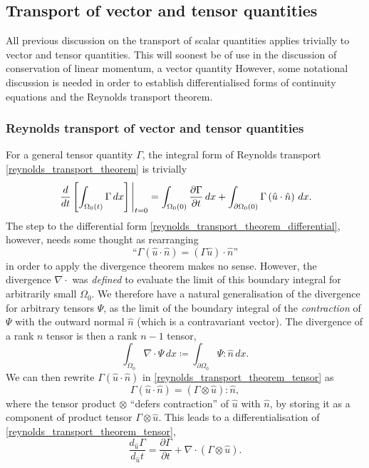 \documentclass[11pt,a4paper]{memoir}
\newcommand{\Part}[2]{\frac{\partial #1}{\partial #2}}
\begin{document}
\subsection{Transport of vector and tensor quantities}
All previous discussion on the transport of scalar quantities applies trivially to vector and tensor quantities.
This will soonest be of use in the discussion of conservation of linear momentum, a vector quantity
However, some notational discussion is needed in order to establish differentialised forms of continuity equations and the Reynolds transport theorem.
\subsubsection{Reynolds transport of vector and tensor quantities}
For a general tensor quantity $\Gamma$, the integral form of Reynolds transport \eqref{reynolds_transport_theorem} is trivially
\begin{equation}\label{reynolds_transport_theorem_tensor}
    \eval{\frac{d}{dt}\left[\int_{\Omega_0(t)}\Gamma\,dx\right]}_{t=0} =
        \int_{\Omega_0(0)}\Part{\Gamma}{t}\,dx + \int_{\partial\Omega_0(0)}\Gamma \left(\hat{u}\cdot\hat{n}\right) \,dx.
\end{equation}
The step to the differential form \eqref{reynolds_transport_theorem_differential}, however, needs some thought
as rearranging
    $$\text{``}\Gamma\left(\hat{u}\cdot \hat{n}\right) = (\Gamma\hat{u})\cdot \hat{n}\text{''}$$
in order to apply the divergence theorem makes no sense. However, the divergence $\nabla \cdot$ was \textit{defined}
to evaluate the limit of this boundary integral for arbitrarily small $\Omega_0$. We therefore have a natural generalisation of the
divergence for arbitrary tensors $\Psi$, as the limit of the boundary integral of the \textit{contraction} of $\Psi$ with the outward normal
$\hat{n}$ (which is a contravariant vector). The divergence of a rank $n$ tensor is then a rank $n-1$ tensor,
\begin{equation}\label{tensor_divergence}
    \int_{\Omega_0} \nabla\cdot\Psi\,dx \coloneqq
        \int_{\partial{\Omega_0}} \Psi : \hat{n}\,dx.
\end{equation}
We can then rewrite $\Gamma \left(\hat{u}\cdot \hat{n}\right)$ in \eqref{reynolds_transport_theorem_tensor} as
    $$\Gamma \left(\hat{u}\cdot \hat{n}\right) = \left(\Gamma \otimes \hat{u}\right) : \hat{n},$$
where the tensor product $\otimes$ ``defers contraction'' of $\hat{u}$ with $\hat{n}$, by storing it as a component of product tensor $\Gamma \otimes \hat{u}$.
This leads to a differentialisation of \eqref{reynolds_transport_theorem_tensor},
\begin{equation}\label{reynolds_transport_theorem_tensor_differential}
    \frac{d_{\hat{u}}\Gamma}{d_{\hat{u}}t} = \Part{\Gamma}{t} + \nabla \cdot(\Gamma \otimes \hat{u}).
\end{equation}
\end{document}
